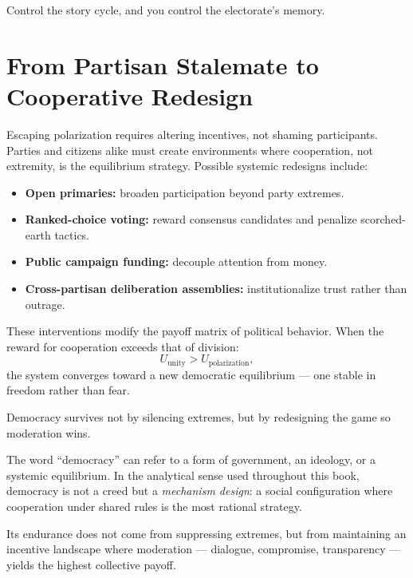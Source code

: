 \documentclass[12pt,twoside]{book}
\begin{document}
\begin{keyidea}
Control the story cycle, and you control the electorate’s memory.
\end{keyidea}

\section{From Partisan Stalemate to Cooperative Redesign}

Escaping polarization requires altering incentives, not shaming participants.  
Parties and citizens alike must create environments where cooperation, not extremity, is the equilibrium strategy.  
Possible systemic redesigns include:
\begin{itemize}
  \item \textbf{Open primaries:} broaden participation beyond party extremes.  
  \item \textbf{Ranked-choice voting:} reward consensus candidates and penalize scorched-earth tactics.  
  \item \textbf{Public campaign funding:} decouple attention from money.  
  \item \textbf{Cross-partisan deliberation assemblies:} institutionalize trust rather than outrage.  
\end{itemize}

These interventions modify the payoff matrix of political behavior.  
When the reward for cooperation exceeds that of division:
\[
U_{\text{unity}} > U_{\text{polarization}},
\]
the system converges toward a new democratic equilibrium --- one stable in freedom rather than fear.\\

\begin{keyidea}
Democracy survives not by silencing extremes, but by redesigning the game so moderation wins.
\end{keyidea}

\begin{tcolorbox}[colback=gray!5,colframe=gray!60,boxrule=0.4pt,arc=1mm,
title={Clarifying Democracy}]
The word “democracy” can refer to a form of government, an ideology, or a systemic equilibrium.  
In the analytical sense used throughout this book, democracy is not a creed but a \emph{mechanism design}:  
a social configuration where cooperation under shared rules is the most rational strategy.

Its endurance does not come from suppressing extremes, but from maintaining an incentive landscape where moderation --- dialogue, compromise, transparency --- yields the highest collective payoff.
\end{tcolorbox}
\end{document}
